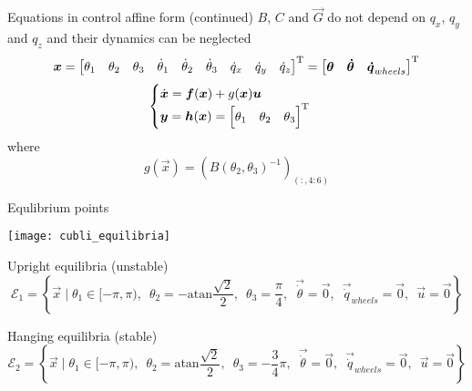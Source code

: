 \begin{frame}{Equations in control affine form (continued)}
  $B$, $C$ and $\vec{G}$ do \alert{not} depend on $q_x$, $q_y$ and $q_z$ and their dynamics can be neglected
  \[
  \boldsymbol{x} =
  \begin{bmatrix}
    \theta_1 & \theta_2 & \theta_3 & \dot{\theta}_1 & \dot{\theta}_2 & \dot{\theta}_3 & \dot{q}_x & \dot{q}_y & \dot{q}_z
  \end{bmatrix}^{\mathrm{T}} = \begin{bmatrix}
    \boldsymbol{\theta} & \boldsymbol{\dot{\theta}} & \boldsymbol{\dot{q}}_{wheels}
  \end{bmatrix}^{\mathrm{T}}
  \]
  \[
  \begin{cases}
    \dot{\boldsymbol{x}} = \boldsymbol{f}(\boldsymbol{x}) + g(\boldsymbol{x}) \boldsymbol{u} \\
    \boldsymbol{y} = \boldsymbol{h}(\boldsymbol{x}) =
    \begin{bmatrix}
      \theta_1 &
      \theta_2 &
      \theta_3
    \end{bmatrix} ^{\mathrm{T}}
  \end{cases}
  \]
  where
  \[
  g(\vec{x}) = \left(B(\theta_2,\theta_3) ^ {-1}\right)_{(:, 4:6)}
  \]
\end{frame}

\begin{frame}[shrink = 30]{Equlibrium points}
  \begin{center}
    \texttt{[image: cubli\_equilibria]}
  \end{center}
  \begin{block}{Upright equilibria (unstable)}
  \[
  \mathcal{E}_{1} = \left\{ \vec{x} \mid \theta_1 \in [-\pi, \pi),\enspace \theta_2 = -\mathrm{atan}\frac{\sqrt{2}}{2},\enspace
   \theta_3 = \frac{\pi}{4},\enspace
    \vec{\dot{\theta}} = \vec{0},\enspace
    \vec{\dot{q}}_{wheels} = \vec{0},\enspace
    \vec{u} = \vec{0}
    \right\}
   \]
  \end{block}
  \begin{block}{Hanging equilibria (stable)}
    \[
    \mathcal{E}_{2} = \left\{
    \vec{x} \mid \theta_1 \in [-\pi, \pi),\enspace
      \theta_2 = \mathrm{atan}\frac{\sqrt{2}}{2},\enspace
    \theta_3 = -\frac{3}{4} \pi,\enspace
    \vec{\dot{\theta}} = \vec{0},\enspace
    \vec{\dot{q}}_{wheels} = \vec{0},\enspace
    \vec{u} = \vec{0}
    \right\}
    \]
  \end{block}
\end{frame}
